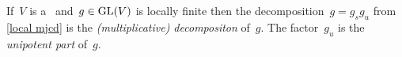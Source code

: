 %   
%   
%   


\begin{definition}
  If~$V$ is a~{\kvs} and~$g \in \operatorname{GL}(V)$ is locally finite then the decomposition~$g = g_s g_u$ from \cref{local mjcd} is the \emph{\textup(multiplicative\textup) {\JCD} decompositon} of~$g$.
  The factor~$g_u$ is the \emph{unipotent part} of~$g$.
\end{definition}


